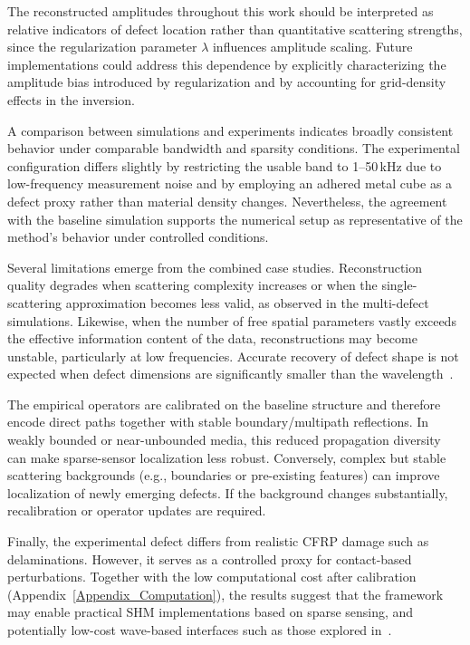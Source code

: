 \documentclass[a4paper,fleqn]{cas-sc}
\begin{document}
The reconstructed amplitudes throughout this work should be interpreted as relative indicators of defect location rather than quantitative scattering strengths, since the regularization parameter $\lambda$ influences amplitude scaling. Future implementations could address this dependence by explicitly characterizing the amplitude bias introduced by regularization and by accounting for grid-density effects in the inversion.

A comparison between simulations and experiments indicates broadly consistent behavior under comparable bandwidth and sparsity conditions. The experimental configuration differs slightly by restricting the usable band to 1--50\,kHz due to low-frequency measurement noise and by employing an adhered metal cube as a defect proxy rather than material density changes. Nevertheless, the agreement with the baseline simulation supports the numerical setup as representative of the method’s behavior under controlled conditions.

Several limitations emerge from the combined case studies. Reconstruction quality degrades when scattering complexity increases or when the single-scattering approximation becomes less valid, as observed in the multi-defect simulations. Likewise, when the number of free spatial parameters vastly exceeds the effective information content of the data, reconstructions may become unstable, particularly at low frequencies. Accurate recovery of defect shape is not expected when defect dimensions are significantly smaller than the wavelength~\cite{WueestMScThesis}.

The empirical operators are calibrated on the baseline structure and therefore encode direct paths together with stable boundary/multipath reflections. In weakly bounded or near-unbounded media, this reduced propagation diversity can make sparse-sensor localization less robust. Conversely, complex but stable scattering backgrounds (e.g., boundaries or pre-existing features) can improve localization of newly emerging defects. If the background changes substantially, recalibration or operator updates are required.

Finally, the experimental defect differs from realistic CFRP damage such as delaminations. However, it serves as a controlled proxy for contact-based perturbations. Together with the low computational cost after calibration (Appendix~\ref{Appendix_Computation}), the results suggest that the framework may enable practical SHM implementations based on sparse sensing, and potentially low-cost wave-based interfaces such as those explored in~\cite{Touchscreen}.
\end{document}
